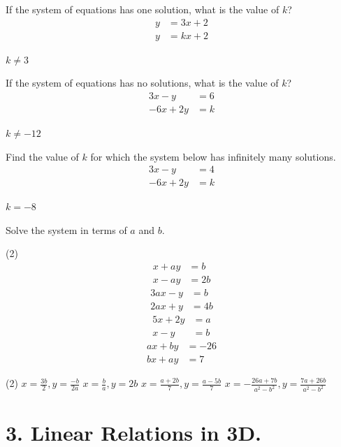 \documentclass[12pt,fleqn]{book}
\newcommand{\prb}[1]{\begin{Exercise}#1\end{Exercise}}
\newcommand{\sol}[1]{\begin{Answer}#1\end{Answer}}
\begin{document}
\prb{ If the system of equations has one solution, what is the value of $k$?
	\begin{align*}
		y & = 3x+2 \\
		y & = kx+2
	\end{align*}
}
\vspace{1in}
\sol{$k\ne 3$}
\prb{ If the system of equations has no solutions, what is the value of $k$?
	\begin{align*}
		3x-y   & = 6 \\
		-6x+2y & = k
	\end{align*}
}
\vspace{1in}
\sol{$k\ne -12$}
\prb{Find the value of $k$ for which the system below has infinitely many solutions.
	\begin{align*}
		3x-y   & = 4 \\
		-6x+2y & = k
	\end{align*}
}
\sol{$k=-8$}
\vspace{1in}
\prb{Solve the system in terms of $a$ and $b$.
	\begin{tasks}(2)
		\task 	\vspace{-2.4em}
		\begin{align*}
			x+ay & = b  \\
			x-ay & = 2b
		\end{align*}
		\task	\vspace{-2.4em}
		\begin{align*}
			3ax-y & =b  \\
			2ax+y & =4b
		\end{align*}
		\vspace{1in}
		\task	\vspace{-2.4em}
		\begin{align*}
			5x+2y & = a \\
			x-y   & = b
		\end{align*}
		\task 	\vspace{-2.4em}
		\begin{align*}
			ax+by & = -26 \\
			bx+ay & = 7
		\end{align*}
	\end{tasks}
}
\sol{
	\begin{tasks}(2)
		\task $x=\frac{3b}{2}, y=\frac{-b}{2a}$
		\task $x=\frac{b}{a}, y=2b$
		\task $x=\frac{a+2b}{7}, y=\frac{a-5b}{7}$
		\task $x=-\frac{26a+7b}{a^2-b^2}, y=\frac{7a+26b}{a^2-b^2}$
	\end{tasks}
}

\clearpage
\chapter{3. Linear Relations in 3D.}
\end{document}
